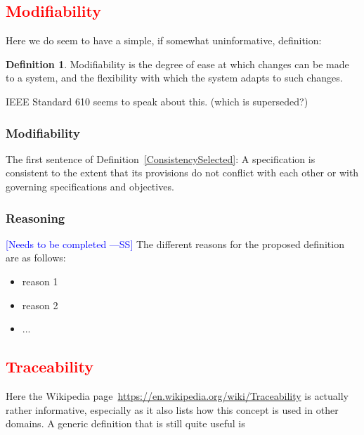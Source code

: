 \documentclass[letterpaper, cleveref]{lipics-v2019}
\newcommand{\authornote}[3]{\textcolor{#1}{[#3 ---#2]}}
\newcommand{\authornote}[3]{}
\newcommand{\wss}[1]{\authornote{blue}{SS}{#1}} %
\newcommand{\jc}[1]{\authornote{red}{JC}{#1}} %
\newcommand{\notdone}[1]{\textcolor{red}{#1}}
\theoremstyle{definition}
\newtheorem{defn}{Definition}
\begin{document}

\subsection{\notdone{Modifiability}} %

Here we do seem to have a simple, if somewhat uninformative, definition:

\begin{defn}
  Modifiability is the degree of ease at which changes can be made to a
  system, and the flexibility with which the system adapts to such changes.
\end{defn}

IEEE Standard 610 seems to speak about this. (which is superseded?)

\begin{mybox}
\subsubsection*{Modifiability} 
The first sentence of Definition~\ref{ConsistencySelected}: A specification is
consistent to the extent that its provisions do not conflict with each other or
with governing specifications and objectives.
\end{mybox}

\subsubsection*{Reasoning}

\wss{Needs to be completed}   The
different reasons for the proposed definition are as follows:

\begin{itemize}
  \item reason 1
  \item reason 2
  \item ...
\end{itemize}


\subsection{\notdone{Traceability}} %

Here the Wikipedia page~\url{https://en.wikipedia.org/wiki/Traceability} is
actually rather informative, especially as it also lists how this concept is
used in other domains.  A generic definition that is still quite useful is
\end{document}
